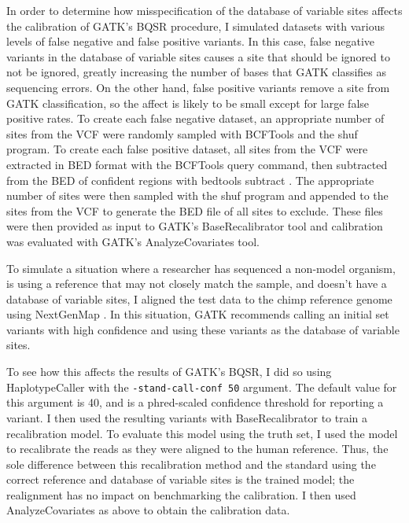 In order to determine how misspecification of the database of variable sites affects the calibration of GATK's BQSR procedure, I simulated datasets with various levels of false negative and false positive variants. In this case, false negative variants in the database of variable sites causes a site that should be ignored to not be ignored, greatly increasing the number of bases that GATK classifies as sequencing errors. On the other hand, false positive variants remove a site from GATK classification, so the affect is likely to be small except for large false positive rates. To create each false negative dataset, an appropriate number of sites from the VCF were randomly sampled with BCFTools and the shuf program. To create each false positive dataset, all sites from the VCF were extracted in BED format with the BCFTools query command, then subtracted from the BED of confident regions with bedtools subtract \parencite{quinlan_bedtools_2010}. The appropriate number of sites were then sampled with the shuf program and appended to the sites from the VCF to generate the BED file of all sites to exclude. These files were then provided as input to GATK's BaseRecalibrator tool and calibration was evaluated with GATK's AnalyzeCovariates tool.

To simulate a situation where a researcher has sequenced a non-model organism, is using a reference that may not closely match the sample, and doesn't have a database of variable sites, I aligned the test data to the chimp reference genome \parencite{waterson_initial_2005} using NextGenMap \parencite{sedlazeck_nextgenmap_2013}.
In this situation, GATK recommends calling an initial set variants with high confidence and using these variants as the database of variable sites. %

To see how this affects the results of GATK's BQSR, I did so using HaplotypeCaller with the \texttt{-stand-call-conf 50} argument. The default value for this argument is 40, and is a phred-scaled confidence threshold for reporting a variant. I then used the resulting variants with BaseRecalibrator to train a recalibration model. To evaluate this model using the truth set, I used the model to recalibrate the reads as they were aligned to the human reference. Thus, the sole difference between this recalibration method and the standard using the correct reference and database of variable sites is the trained model; the realignment has no impact on benchmarking the calibration. I then used AnalyzeCovariates as above to obtain the calibration data.


